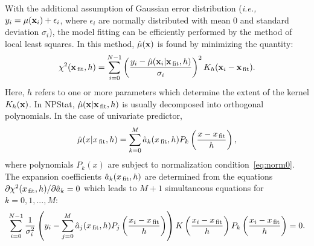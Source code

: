 \documentclass[12pt,titlepage]{article}
\newcommand{\sub}[1]{\ensuremath{_{\mbox{\scriptsize \,#1}}}}
\begin{document}
With the additional assumption of Gaussian error distribution ({\it i.e.,}
$y_i = \mu({\bf x}_i) + \epsilon_i$, where $\epsilon_i$ are normally distributed
with mean 0 and standard deviation $\sigma_i$), the
model fitting can be efficiently performed by the method of local
least squares. In this method, $\hat{\mu}({\bf x})$ is found by
minimizing the quantity:
\begin{equation}
\chi^2({\bf x}\sub{fit}, h) = \sum_{i=0}^{N-1} \left(\frac{y_i - \hat{\mu}({\bf x}_i|{\bf x}\sub{fit},h)}{\sigma_i}\right)^2 K_h({\bf x}_i - {\bf x}\sub{fit}).
\label{eq:localleastsq}
\end{equation}
Here, $h$ refers to one or more parameters which determine
the extent of the kernel $K_h({\bf x})$.
In NPStat, $\hat{\mu}({\bf x}|{\bf x}\sub{fit},h)$ is usually decomposed
into orthogonal polynomials. In the case of univariate predictor,
\begin{equation}
\hat{\mu}(x|x\sub{fit},h) = \sum_{k=0}^{M} \hat{a}_k(x\sub{fit},h) P_k\left(\frac{x - x\sub{fit}}{h}\right),
\label{eq:regmodel}
\end{equation}
where polynomials $P_k(x)$ are subject to normalization condition~\ref{eq:norm0}.
The expansion coefficients $\hat{a}_k(x\sub{fit},h)$ are determined from
the equations $\partial \chi^2(x\sub{fit},h)/ \partial \hat{a}_k = 0$
which leads to $M + 1$ simultaneous equations for $k = 0, 1, ..., M$:
\begin{equation}
\sum_{i=0}^{N-1} \frac{1}{\sigma_i^2} \left( y_i - \sum_{j=0}^{M} \hat{a}_j(x\sub{fit},h) P_j\left(\frac{x_i - x\sub{fit}}{h}\right) \right)  K\left(\frac{x_i - x\sub{fit}}{h}\right) P_k\left(\frac{x_i - x\sub{fit}}{h}\right) = 0.
\label{eq:regsystem}
\end{equation}
\end{document}
